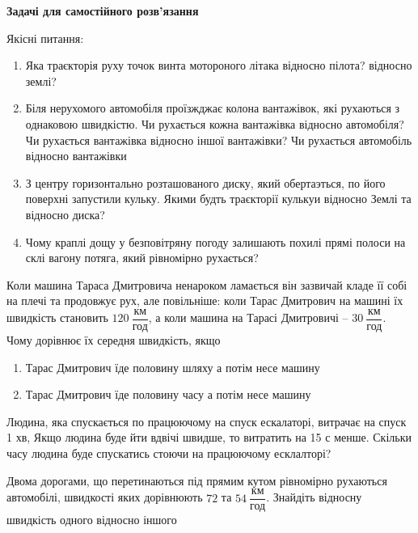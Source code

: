 \textbf{Задачі для самостійного розв'язання}
\begin{problem}{1}
	Якісні питання:
	\begin{enumerate}
		\item Яка траєкторія руху точок винта мотороного літака відносно пілота?  відносно землі?
		\item Біля нерухомого автомобіля проїзжджає колона вантажівок, які рухаються з однаковою швидкістю. Чи рухається кожна вантажівка відносно автомобіля? Чи рухається вантажівка відносно іншої вантажівки? Чи рухається автомобіль відносно вантажівки
		\item З центру горизонтально розташованого диску, який обертаэться, по його поверхні запустили кульку. Якими будть траєкторії кулькуи відносно Землі та відносно диска?
		\item Чому краплі дощу у безповітряну погоду залишають похилі прямі полоси на склі вагону потяга, який рівномірно рухається?
	\end{enumerate}
\end{problem}

\begin{problem}{3}
	Коли машина Тараса Дмитровича ненароком ламається він зазвичай кладе її собі на плечі та продовжує рух, але повільніше: коли Тарас Дмитрович на машині їх швидкість становить $120~\dfrac{\text{км}}{\text{год}}$, а коли машина на Тарасі Дмитровичі -- $30~\dfrac{\text{км}}{\text{год}}$. Чому дорівнює їх середня швидкість, якщо 
	\begin{enumerate}
		\item Тарас Дмитрович їде половину шляху а потім несе машину
		\item Тарас Дмитрович їде половину часу а потім несе машину
	\end{enumerate}
\end{problem}

\begin{problem}{5}
	Людина, яка спускається по працюючому на спуск ескалаторі, витрачає на спуск 1 хв, Якщо людина буде йти вдвічі швидше, то витратить на 15 с менше. Скільки часу людина буде спускатись стоючи на працюючому есклалторі?
\end{problem}

\begin{problem}{2}
	Двома дорогами, що перетинаються під прямим кутом рівномірно рухаються автомобілі, швидкості яких дорівнюють $72$ та $54~\dfrac{\text{км}}{\text{год}}$. Знайдіть відносну швидкість одного відносно іншого
\end{problem}

